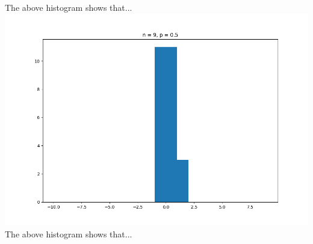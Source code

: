 \documentclass[answers]{exam}
\begin{document}
The above histogram shows that...\\
\includegraphics[scale = 0.7]{Q1_histograms/q1n = 9, p = 0.5.png}\\
The above histogram shows that...\\
\pagebreak
\end{document}
